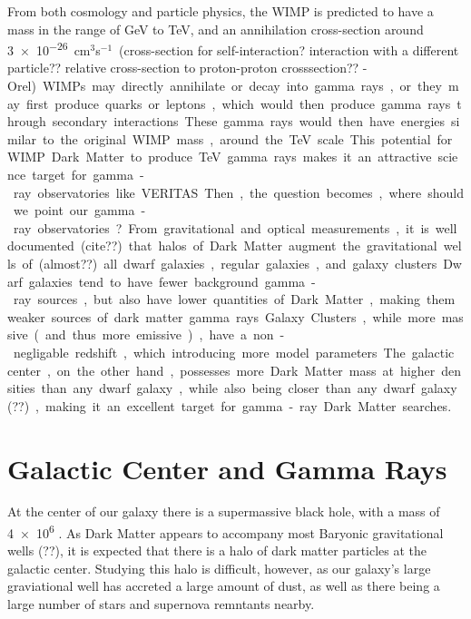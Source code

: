   From both cosmology and particle physics, the WIMP is predicted to have a mass in the range of GeV to TeV, and an annihilation cross-section around \nicetilde{}\SI{3e-26}{cm${}^3$s${}^{-1}$} {\color{red}(cross-section for self-interaction? interaction with a different particle?? relative cross-section to proton-proton crosssection?? -Orel)}.
  WIMPs may directly annihilate or decay into gamma rays, or they may first produce quarks or leptons, which would then produce gamma rays through secondary interactions.
  These gamma rays would then have energies similar to the original WIMP mass, around the TeV scale.
  This potential for WIMP Dark Matter to produce TeV gamma rays makes it an attractive science target for gamma-ray observatories like VERITAS.

  Then, the question becomes, where should we point our gamma-ray observatories?
  From gravitational and optical measurements, it is well documented {\color{red}(cite??)} that halos of Dark Matter augment the gravitational wells of {\color{red}(almost??)} all dwarf galaxies, regular galaxies, and galaxy clusters.
  Dwarf galaxies tend to have fewer background gamma-ray sources, but also have lower quantities of Dark Matter, making them weaker sources of dark matter gamma rays.
  Galaxy Clusters, while more massive (and thus more emissive), have a non-negligable redshift, which introducing more model parameters.
  The galactic center, on the other hand, possesses more Dark Matter mass at higher densities than any dwarf galaxy, while also being closer than any dwarf galaxy {\color{red}(??)}, making it an excellent target for gamma-ray Dark Matter searches.


\section{Galactic Center and Gamma Rays}

  At the center of our galaxy there is a supermassive black hole, with a mass of \SI{4e6}{\Msol{}} \cite{sgra_massdist}.
  As Dark Matter appears to accompany most Baryonic gravitational wells {\color{red}(??)}, it is expected that there is a halo of dark matter particles at the galactic center.
  Studying this halo is difficult, however, as our galaxy's large graviational well has accreted a large amount of dust, as well as there being a large number of stars and supernova remntants nearby.

